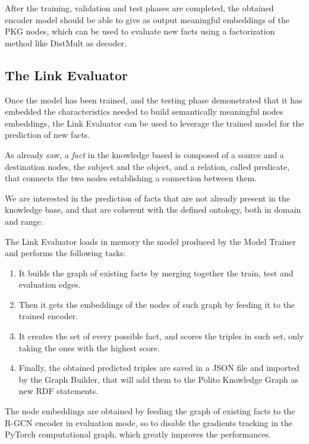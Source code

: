 \documentclass[%
    corpo=13.5pt,
    twoside,
    oldstyle,
    tipotesi=magistrale,
    greek,
    evenboxes
]{toptesi}
\begin{document}
After the training, validation and test phases are completed, the obtained
encoder model should be able to give as output meaningful embeddings of the
PKG nodes, which can be used to evaluate new facts using a factorization method
like DistMult as decoder.



\subsection{The Link Evaluator}

Once the model has been trained, and the testing phase demonstrated
that it has embedded the characteristics needed to build
semantically meaningful nodes embeddings, the Link Evaluator can be
used to leverage the trained model for the prediction of new facts.

As already saw, a \emph{fact} in the knowledge based is composed of a source
and a destination nodes, the subject and the object, and a relation, called
predicate, that connects the two nodes establishing a connection between them.

We are interested in the prediction of facts that are not already present in
the knowledge base, and that are coherent with the defined ontology, both in
domain and range.

The Link Evaluator loads in memory the model produced by the Model Trainer and
performs the following tasks:

\begin{enumerate}
    \item It builds the graph of existing facts by merging together the train,
        test and evaluation edges.
    \item Then it gets the embeddings of the nodes of such graph by feeding it
        to the trained encoder.
    \item It creates the set of every possible fact, and scores the triples in
        such set, only taking the ones with the highest score.
    \item Finally, the obtained predicted triples are saved in a JSON file
        and imported by the Graph Builder, that will add them to the Polito
        Knowledge Graph as new RDF statements.
\end{enumerate}

The node embeddings are obtained by feeding the graph of existing facts to the
R-GCN encoder in evaluation mode, so to disable the gradients tracking in the
PyTorch computational graph, which greatly improves the performances.
\end{document}
